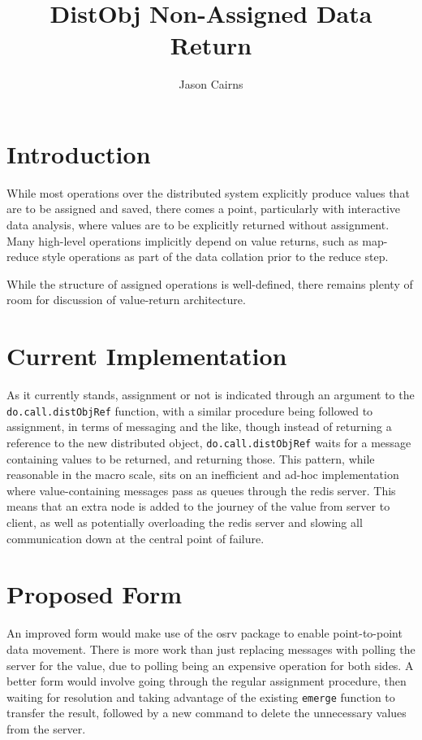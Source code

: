 \documentclass[a4paper,10pt]{article}
\begin{document}
\title{DistObj Non-Assigned Data Return}
\author{Jason Cairns}
  
\maketitle{}

\section{Introduction}

While most operations over the distributed system explicitly produce values
that are to be assigned and saved, there comes a point, particularly with
interactive data analysis, where values are to be explicitly returned without
assignment.
Many high-level operations implicitly depend on value returns, such as
map-reduce style operations as part of the data collation prior to the reduce
step.

While the structure of assigned operations is well-defined, there remains
plenty of room for discussion of value-return architecture.

\section{Current Implementation}

As it currently stands, assignment or not is indicated through an argument to
the \texttt{do.call.distObjRef} function, with a similar procedure
being followed to assignment, in terms of messaging and the like, though
instead of returning a reference to the new distributed object,
\texttt{do.call.distObjRef} waits for a message containing values to
be returned, and returning those.
This pattern, while reasonable in the macro scale, sits on an inefficient and
ad-hoc implementation where value-containing messages pass as queues through
the redis server.
This means that an extra node is added to the journey of the value from server
to client, as well as potentially overloading the redis server and slowing all
communication down at the central point of failure.

\section{Proposed Form}

An improved form would make use of the osrv package to enable point-to-point data movement.
There is more work than just replacing messages with polling the server for the
value, due to polling being an expensive operation for both sides.
A better form would involve going through the regular assignment procedure,
then waiting for resolution and taking advantage of the existing
\texttt{emerge} function to transfer the result, followed by a new
command to delete the unnecessary values from the server.
\end{document}
